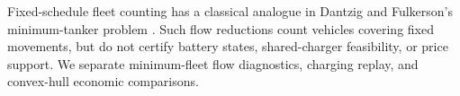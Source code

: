 Fixed-schedule fleet counting has a classical analogue in Dantzig and Fulkerson's minimum-tanker problem \citep{dantzigFulkerson1954}. Such flow reductions count vehicles covering fixed movements, but do not certify battery states, shared-charger feasibility, or price support. We separate minimum-fleet flow diagnostics, charging replay, and convex-hull economic comparisons.
